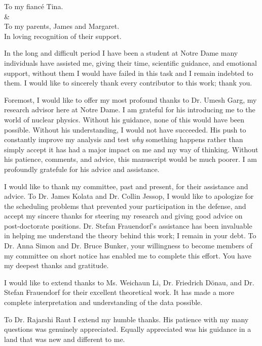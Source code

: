 \documentclass[final,numrefs,sort&compress]{nddiss2e}
\begin{document}
\begin{dedication}
	To my fianc\'e Tina.\\\&\\To my parents, James and Margaret.\\
	In loving recognition of their support.
\end{dedication}

\tableofcontents
\listoffigures
\listoftables

\begin{acknowledge}
In the long and difficult period I have been a student at Notre Dame many individuals have assisted me, giving their time, scientific guidance, and emotional support, without them I would have failed in this task and I remain indebted to them. I would like to sincerely thank every contributor to this work; thank you.

Foremost, I would like to offer my most profound thanks to Dr. Umesh Garg, my research advisor here at Notre Dame. I am grateful for his introducing me to the world of nuclear physics. Without his guidance, none of this would have been possible. Without his understanding, I would not have succeeded. His push to constantly improve my analysis and test \emph{why} something happens rather than simply accept it has had a major impact on me and my way of thinking. Without his patience, comments, and advice, this manuscript would be much poorer. I am profoundly gratefule for his advice and assistance.

I would like to thank my committee, past and present, for their assistance and advice. To Dr. James Kolata and Dr. Collin Jessop, I would like to apologize for the scheduling problems that prevented your participation in the defense, and accept my sincere thanks for steering my research and giving good advice on post-doctorate positions. Dr. Stefan Frauendorf's assistance has been invaluable in helping me understand the theory behind this work; I remain in your debt. To Dr. Anna Simon and Dr. Bruce Bunker, your willingness to become members of my committee on short notice has enabled me to complete this effort. You have my deepest thanks and gratitude.

I would like to extend thanks to Ms. Weichaun Li, Dr. Friedrich D\"onau, and Dr. Stefan Frauendorf for their excellent theoretical work. It has made a more complete interpretation and understanding of the data possible.

To Dr. Rajarshi Raut I extend my humble thanks. His patience with my many questions was genuinely appreciated. Equally appreciated was his guidance in a land that was new and different to me.


\end{acknowledge}
\end{document}
